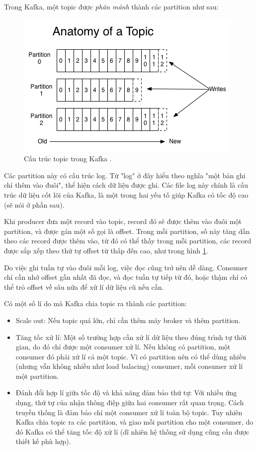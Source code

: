 \documentclass{article}
\begin{document}
Trong Kafka, một topic được \emph{phân mảnh} thành các partition như sau:

\begin{figure}[H]
    \includegraphics[scale=0.5]{log_anatomy.png}
    \centering
    \caption{Cấu trúc topic trong Kafka \cite{kafka_intro}.}
    \label{log_anatomy}
\end{figure}

Các partition này có cấu trúc log. Từ "log" ở đây hiểu theo nghĩa "một bản ghi
chỉ thêm vào đuôi", thể hiện cách dữ liệu được ghi. Các file log này chính là
cấu trúc dữ liệu cốt lõi của Kafka, là một trong hai yếu tố giúp Kafka có tốc độ
cao (sẽ nói ở phần sau).

Khi producer đưa một record vào topic, record đó sẽ được thêm vào đuôi một
partition, và được gán một số gọi là offset. Trong mỗi partition, số này tăng
dần theo các record được thêm vào, từ đó có thể thấy trong mỗi partition, các
record được sắp xếp theo thứ tự offset từ thấp đến cao, như trong hình
\ref{log_anatomy}.

Do việc ghi tuần tự vào đuôi mỗi log, việc đọc cũng trở nên dễ dàng. Consumer
chỉ cần nhớ offset gần nhất đã đọc, và đọc tuần tự tiếp từ đó, hoặc thậm chí có
thể trỏ offset về sâu nữa để xử lí dữ liệu cũ nếu cần.

Có một số lí do mà Kafka chia topic ra thành các partition:

\begin{itemize}
    \item Scale out: Nếu topic quá lớn, chỉ cần thêm máy broker và thêm partition.
    \item Tăng tốc xử lí: Một số trường hợp cần xử lí dữ liệu theo đúng trình tự
    thời gian, do đó chỉ được một consumer xử lí. Nếu không có partition, một
    consumer đó phải xử lí cả một topic. Vì có partition nên có thể dùng nhiều
    (nhưng vẫn không nhiều như load balacing) consumer, mỗi consumer xử lí một
    partition.
    \item Đánh đổi hợp lí giữa tốc độ và khả năng đảm bảo thứ tự: Với nhiều ứng
    dụng, thứ tự của nhận thông điệp giữa hai consumer rất quan trọng. Cách
    truyền thống là đảm bảo chỉ một consumer xử lí toàn bộ topic. Tuy nhiên
    Kafka chia topic ra các partition, và giao mỗi partition cho một consumer,
    do đó Kafka có thể tăng tốc độ xử lí (dĩ nhiên hệ thống sử dụng cũng cần
    được thiết kế phù hợp).

\end{itemize}
\end{document}

